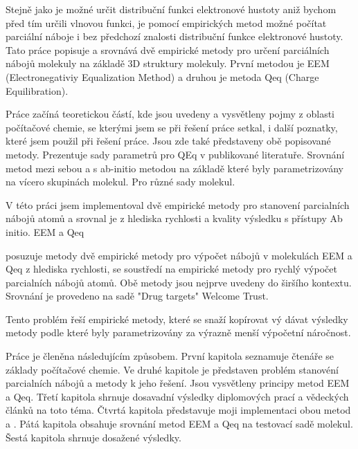 \documentclass[
  color, %
  table, %
  lof,   %
  lot,   %
]{fithesis3}
\newcommand\todo[1]{\textcolor{blue}{[[#1]]}}
\begin{document}
Stejně jako je možné určit distribuční funkci elektronové hustoty aniž bychom před tím určili vlnovou funkci, je pomocí empirických metod možné počítat parciální náboje i bez předchozí znalosti distribuční funkce elektronové hustoty. Tato práce popisuje a srovnává dvě empirické metody pro určení parciálních nábojů molekuly na základě 3D struktury molekuly. První metodou je EEM (Electronegativiy Equalization Method) a druhou je metoda Qeq (Charge Equilibration).

Práce začíná teoretickou částí, kde jsou uvedeny a vysvětleny pojmy z oblasti počítačové chemie, se kterými jsem se při řešení práce setkal, i další poznatky, které jsem použil při řešení práce. Jsou zde také představeny obě popisované metody. Prezentuje sady parametrů pro QEq v publikované literatuře. Srovnání metod mezi sebou a s ab-initio metodou na základě které byly parametrizovány na vícero skupinách molekul. Pro různé sady molekul. 

V této práci jsem implementoval dvě empirické metody pro stanovení parcialních nábojů atomů a srovnal je z hlediska rychlosti a kvality výsledku s přístupy Ab initio. EEM a Qeq

posuzuje metody dvě empirické metody pro výpočet nábojů v molekulách EEM a Qeq z hlediska rychlosti, se soustředí na empirické metody pro rychlý výpočet parcialních nábojů atomů. Obě metody jsou nejprve uvedeny do širšího kontextu. Srovnání je provedeno na sadě "Drug targets" Welcome Trust. 

Tento problém řeší empirické metody, které se snaží kopírovat vý dávat výsledky metody podle které byly parametrizovány za výrazně menší výpočetní náročnost.

Práce je členěna následujícím způsobem. První kapitola seznamuje čtenáře se základy počítačové chemie. Ve druhé kapitole je představen problém stanovéní parcialních nábojů a metody k jeho řešení. Jsou vysvětleny principy metod EEM a Qeq. Třetí kapitola shrnuje dosavadní výsledky diplomových prací a vědeckých článků na toto téma. Čtvrtá kapitola představuje moji implementaci obou metod a . Pátá kapitola obsahuje srovnání metod EEM a Qeq na testovací sadě molekul. Šestá kapitola shrnuje dosažené výsledky.

\end{document}
